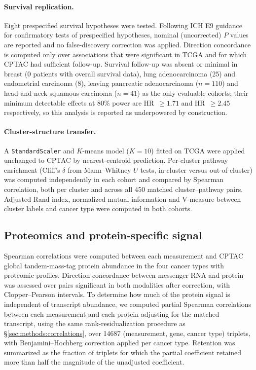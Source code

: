 \paragraph{Survival replication.}
Eight prespecified survival hypotheses were tested. Following ICH E9 guidance for
confirmatory tests of prespecified hypotheses, nominal (uncorrected) $P$ values
are reported and no false-discovery correction was applied. Direction concordance
is computed only over associations that were significant in TCGA and for which
CPTAC had sufficient follow-up. Survival follow-up was absent or minimal in
breast (0 patients with overall survival data), lung adenocarcinoma (25) and
endometrial carcinoma (8), leaving pancreatic adenocarcinoma ($n = 110$) and
head-and-neck squamous carcinoma ($n = 41$) as the only evaluable cohorts; their
minimum detectable effects at 80\% power are HR~$\geq 1.71$ and HR~$\geq 2.45$
respectively, so this analysis is reported as underpowered by construction.

\paragraph{Cluster-structure transfer.}
A \texttt{StandardScaler} and $K$-means model ($K = 10$) fitted on TCGA were
applied unchanged to CPTAC by nearest-centroid prediction. Per-cluster pathway
enrichment (Cliff's $\delta$ from Mann--Whitney $U$ tests, in-cluster versus
out-of-cluster) was computed independently in each cohort and compared by
Spearman correlation, both per cluster and across all 450 matched
cluster--pathway pairs. Adjusted Rand index, normalized mutual information and
V-measure between cluster labels and cancer type were computed in both cohorts.

\subsection{Proteomics and protein-specific signal}
\label{sec:methods:proteomics}

Spearman correlations were computed between each measurement and CPTAC global
tandem-mass-tag protein abundance in the four cancer types with proteomic
profiles. Direction concordance between messenger RNA and protein was assessed
over pairs significant in both modalities after correction, with
Clopper--Pearson intervals. To determine how much of the protein signal is
independent of transcript abundance, we computed partial Spearman correlations
between each measurement and each protein adjusting for the matched transcript,
using the same rank-residualization procedure as
\S\ref{sec:methods:correlations}, over \num{14687} (measurement, gene, cancer
type) triplets, with Benjamini--Hochberg correction applied per cancer type.
Retention was summarized as the fraction of triplets for which the partial
coefficient retained more than half the magnitude of the unadjusted coefficient.

